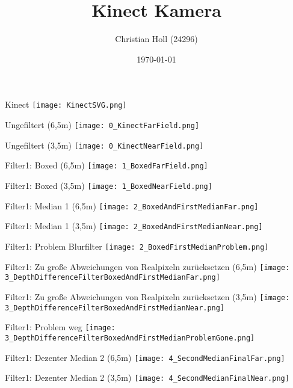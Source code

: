 \documentclass{VLKlauck}
\author[]{Christian Holl (24296)}
\institute[HTW Aaalen - Elektronik und Informatik]
{
	Studiengang Computer Controlled Systems\\
	Hochschule Aalen - Technik und Wirtschaft
}
\title[]{Kinect Kamera}
\date[]{\today}
\begin{document}
\maketitle
 
 
\begin{frame}{Kinect}
	\texttt{[image: KinectSVG.png]}
\end{frame} 
\begin{frame}{Ungefiltert (6,5m)}
	\texttt{[image: 0\_KinectFarField.png]}
\end {frame}
\begin{frame}{Ungefiltert (3,5m)}
	\texttt{[image: 0\_KinectNearField.png]}
\end {frame}
\begin{frame}{Filter1: Boxed (6,5m)}
	\texttt{[image: 1\_BoxedFarField.png]}
\end {frame}
\begin{frame}{Filter1: Boxed (3,5m)}
	\texttt{[image: 1\_BoxedNearField.png]}
\end {frame}
\begin{frame}{Filter1: Median 1 (6,5m)}
	\texttt{[image: 2\_BoxedAndFirstMedianFar.png]}
\end {frame}
\begin{frame}{Filter1: Median 1 (3,5m)}
	\texttt{[image: 2\_BoxedAndFirstMedianNear.png]}
\end {frame}
\begin{frame}{Filter1: Problem Blurfilter}
	\texttt{[image: 2\_BoxedFirstMedianProblem.png]}
\end {frame}
\begin{frame}{Filter1: Zu große Abweichungen von Realpixeln zurücksetzen (6,5m)}
	\texttt{[image: 3\_DepthDifferenceFilterBoxedAndFirstMedianFar.png]}
\end {frame}
\begin{frame}{Filter1: Zu große Abweichungen von Realpixeln zurücksetzen (3,5m)}
	\texttt{[image: 3\_DepthDifferenceFilterBoxedAndFirstMedianNear.png]}
\end {frame}
\begin{frame}{Filter1: Problem weg}
	\texttt{[image: 3\_DepthDifferenceFilterBoxedAndFirstMedianProblemGone.png]}
\end {frame}
\begin{frame}{Filter1: Dezenter Median 2 (6,5m)}
	\texttt{[image: 4\_SecondMedianFinalFar.png]}
\end {frame}
\begin{frame}{Filter1: Dezenter Median 2 (3,5m)}
	\texttt{[image: 4\_SecondMedianFinalNear.png]}
\end {frame}
\end{document}
